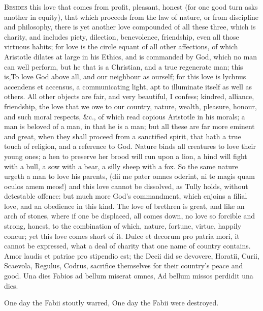 {\lettrine{B}{esides} this love that comes from profit, pleasant, honest (for one
good turn asks another in equity), that which proceeds from the law of
nature, or from discipline and philosophy, there is yet another love
compounded of all these three, which is charity, and includes piety,
dilection, benevolence, friendship, even all those virtuous habits; for
love is the circle equant of all other affections, of which Aristotle
dilates at large in his Ethics, and is commanded by God, which no man
can well perform, but he that is a Christian, and a true regenerate
man; this is,To love God above all, and our neighbour as ourself;
for this love is lychnus accendens et accensus, a communicating light,
apt to illuminate itself as well as others. All other objects are fair,
and very beautiful, I confess; kindred, alliance, friendship, the love
that we owe to our country, nature, wealth, pleasure, honour, and such
moral respects, \&c., of which read copious Aristotle in his
morals; a man is beloved of a man, in that he is a man; but all these
are far more eminent and great, when they shall proceed from a
sanctified spirit, that hath a true touch of religion, and a reference
to God. Nature binds all creatures to love their young ones; a hen to
preserve her brood will run upon a lion, a hind will fight with a bull,
a sow with a bear, a silly sheep with a fox. So the same nature urgeth
a man to love his parents, (dii me pater omnes oderint, ni te
magis quam oculos amem meos!) and this love cannot be dissolved, as
Tully holds, without detestable offence: but much more God's
commandment, which enjoins a filial love, and an obedience in this
kind. The love of brethren is great, and like an arch of stones,
where if one be displaced, all comes down, no love so forcible and
strong, honest, to the combination of which, nature, fortune, virtue,
happily concur; yet this love comes short of it. Dulce et decorum
pro patria mori, it cannot be expressed, what a deal of charity
that one name of country contains. Amor laudis et patriae pro stipendio
est; the Decii did se devovere, Horatii, Curii, Scaevola, Regulus,
Codrus, sacrifice themselves for their country's peace and good.
Una dies Fabios ad bellum miserat omnes,
Ad bellum missos perdidit una dies.

One day the Fabii stoutly warred,
One day the Fabii were destroyed.

}
